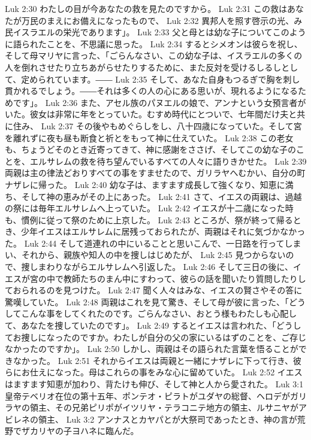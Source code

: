 Luk 2:30  わたしの目が今あなたの救を見たのですから。
Luk 2:31  この救はあなたが万民のまえにお備えになったもので、
Luk 2:32  異邦人を照す啓示の光、み民イスラエルの栄光であります」。
Luk 2:33  父と母とは幼な子についてこのように語られたことを、不思議に思った。
Luk 2:34  するとシメオンは彼らを祝し、そして母マリヤに言った、「ごらんなさい、この幼な子は、イスラエルの多くの人を倒れさせたり立ちあがらせたりするために、また反対を受けるしるしとして、定められています。――
Luk 2:35  そして、あなた自身もつるぎで胸を刺し貫かれるでしょう。――それは多くの人の心にある思いが、現れるようになるためです」。
Luk 2:36  また、アセル族のパヌエルの娘で、アンナという女預言者がいた。彼女は非常に年をとっていた。むすめ時代にとついで、七年間だけ夫と共に住み、
Luk 2:37  その後やもめぐらしをし、八十四歳になっていた。そして宮を離れずに夜も昼も断食と祈とをもって神に仕えていた。
Luk 2:38  この老女も、ちょうどそのとき近寄ってきて、神に感謝をささげ、そしてこの幼な子のことを、エルサレムの救を待ち望んでいるすべての人々に語りきかせた。
Luk 2:39  両親は主の律法どおりすべての事をすませたので、ガリラヤへむかい、自分の町ナザレに帰った。
Luk 2:40  幼な子は、ますます成長して強くなり、知恵に満ち、そして神の恵みがその上にあった。
Luk 2:41  さて、イエスの両親は、過越の祭には毎年エルサレムへ上っていた。
Luk 2:42  イエスが十二歳になった時も、慣例に従って祭のために上京した。
Luk 2:43  ところが、祭が終って帰るとき、少年イエスはエルサレムに居残っておられたが、両親はそれに気づかなかった。
Luk 2:44  そして道連れの中にいることと思いこんで、一日路を行ってしまい、それから、親族や知人の中を捜しはじめたが、
Luk 2:45  見つからないので、捜しまわりながらエルサレムへ引返した。
Luk 2:46  そして三日の後に、イエスが宮の中で教師たちのまん中にすわって、彼らの話を聞いたり質問したりしておられるのを見つけた。
Luk 2:47  聞く人々はみな、イエスの賢さやその答に驚嘆していた。
Luk 2:48  両親はこれを見て驚き、そして母が彼に言った、「どうしてこんな事をしてくれたのです。ごらんなさい、おとう様もわたしも心配して、あなたを捜していたのです」。
Luk 2:49  するとイエスは言われた、「どうしてお捜しになったのですか。わたしが自分の父の家にいるはずのことを、ご存じなかったのですか」。
Luk 2:50  しかし、両親はその語られた言葉を悟ることができなかった。
Luk 2:51  それからイエスは両親と一緒にナザレに下って行き、彼らにお仕えになった。母はこれらの事をみな心に留めていた。
Luk 2:52  イエスはますます知恵が加わり、背たけも伸び、そして神と人から愛された。
Luk 3:1  皇帝テベリオ在位の第十五年、ポンテオ・ピラトがユダヤの総督、ヘロデがガリラヤの領主、その兄弟ピリポがイツリヤ・テラコニテ地方の領主、ルサニヤがアビレネの領主、
Luk 3:2  アンナスとカヤパとが大祭司であったとき、神の言が荒野でザカリヤの子ヨハネに臨んだ。
